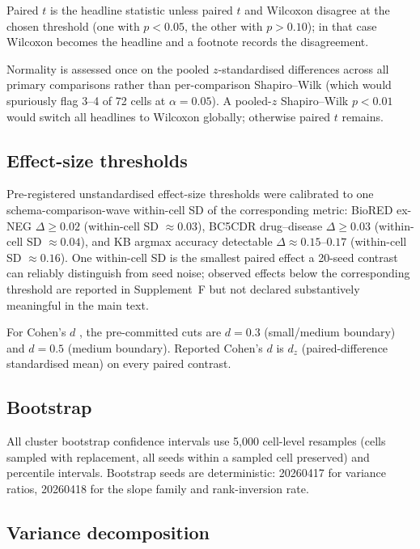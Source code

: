 Paired $t$ is the headline statistic unless paired $t$ and Wilcoxon
disagree at the chosen threshold (one with $p < 0.05$, the other with
$p > 0.10$); in that case Wilcoxon becomes the headline and a
footnote records the disagreement.

Normality is assessed once on the pooled $z$-standardised differences
across all primary comparisons rather than per-comparison
Shapiro--Wilk (which would spuriously flag 3--4 of 72 cells at
$\alpha = 0.05$). A pooled-$z$ Shapiro--Wilk $p < 0.01$ would switch
all headlines to Wilcoxon globally; otherwise paired $t$ remains.

\subsection{Effect-size thresholds}

Pre-registered unstandardised effect-size thresholds were
calibrated to one schema-comparison-wave within-cell SD of the
corresponding metric: BioRED ex-NEG $\Delta \ge 0.02$
(within-cell SD $\approx 0.03$), BC5CDR drug--disease
$\Delta \ge 0.03$ (within-cell SD $\approx 0.04$), and
KB argmax accuracy detectable $\Delta \approx 0.15$--$0.17$
(within-cell SD $\approx 0.16$). One within-cell SD is the
smallest paired effect a 20-seed contrast can reliably distinguish
from seed noise; observed effects below the corresponding threshold
are reported in Supplement~F but not declared substantively
meaningful in the main text.

For Cohen's $d$ \citep{cohen1988statistical}, the pre-committed
cuts are $d = 0.3$ (small/medium boundary) and $d = 0.5$ (medium
boundary). Reported Cohen's $d$ is $d_z$ (paired-difference
standardised mean) on every paired contrast.

\subsection{Bootstrap}

All cluster bootstrap confidence intervals use 5{,}000 cell-level
resamples (cells sampled with replacement, all seeds within a sampled
cell preserved) and percentile intervals. Bootstrap seeds are
deterministic: 20260417 for variance ratios, 20260418 for the slope
family and rank-inversion rate.

\subsection{Variance decomposition}

